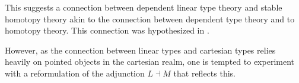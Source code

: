 \documentclass[a4paper,english]{lipics-v2018}
\begin{document}
This suggests a connection between dependent linear type theory and stable homotopy theory akin to the connection between dependent type theory and to homotopy theory. This connection was hypothesized in \cite{schreiber2014quantization}.

However, as the connection between linear types and cartesian types relies heavily on pointed objects in the cartesian realm, one is tempted to experiment with a reformulation of the adjunction $L \dashv M$ that reflects this.
\newpage


\end{document}
